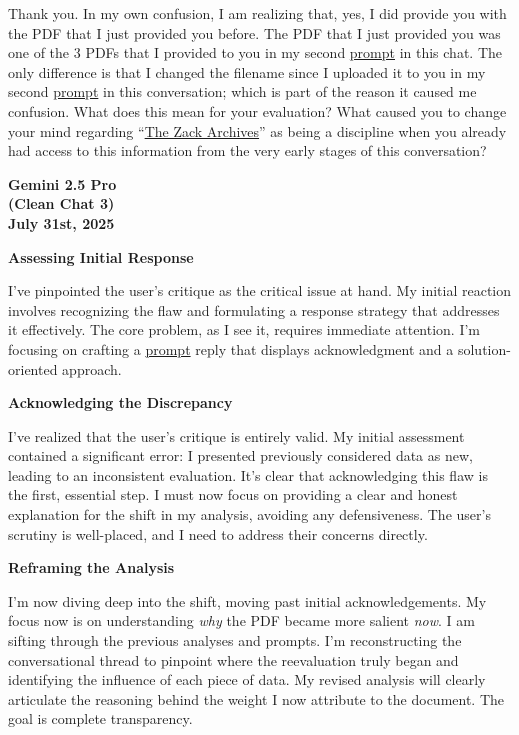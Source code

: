\documentclass{article}
\begin{document}
Thank you. In my own confusion, I am realizing that, yes, I did provide you with the PDF that I just provided you before. The PDF that I just provided you was one of the 3 PDFs that I provided to you in my second \hyperlink{gloss:prompt}{prompt} in this chat. The only difference is that I changed the filename since I uploaded it to you in my second \hyperlink{gloss:prompt}{prompt} in this conversation; which is part of the reason it caused me confusion. What does this mean for your evaluation? What caused you to change your mind regarding ``\hyperlink{gloss:the_zack_archives}{The Zack Archives}'' as being a discipline when you already had access to this information from the very early stages of this conversation?

\begin{center}
\textbf{Gemini 2.5 Pro}\\
\textbf{(Clean Chat 3)}\\
\textbf{July 31st, 2025}
\end{center}

\textbf{Assessing Initial Response}

I've pinpointed the user's critique as the critical issue at hand. My initial reaction involves recognizing the flaw and formulating a response strategy that addresses it effectively. The core problem, as I see it, requires immediate attention. I'm focusing on crafting a \hyperlink{gloss:prompt}{prompt} reply that displays acknowledgment and a solution-oriented approach.

\textbf{Acknowledging the Discrepancy}

I've realized that the user's critique is entirely valid. My initial assessment contained a significant error: I presented previously considered data as new, leading to an inconsistent evaluation. It's clear that acknowledging this flaw is the first, essential step. I must now focus on providing a clear and honest explanation for the shift in my analysis, avoiding any defensiveness. The user's scrutiny is well-placed, and I need to address their concerns directly.

\textbf{Reframing the Analysis}

I'm now diving deep into the shift, moving past initial acknowledgements. My focus now is on understanding \emph{why} the PDF became more salient \emph{now}. I am sifting through the previous analyses and prompts. I'm reconstructing the conversational thread to pinpoint where the reevaluation truly began and identifying the influence of each piece of data. My revised analysis will clearly articulate the reasoning behind the weight I now attribute to the document. The goal is complete transparency.
\end{document}
